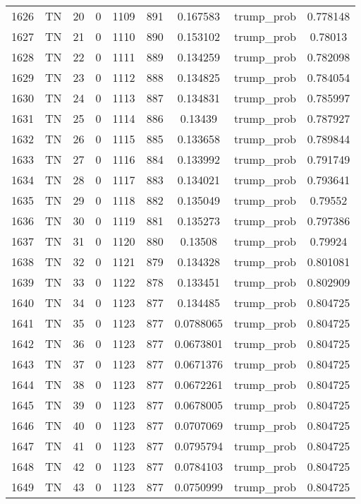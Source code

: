 \documentclass[12pt,a4paper]{article}
\begin{document}
\begin{tabular}{r|cccccccc}
	1626 & TN & 20 & 0 & 1109 & 891 & 0.167583 & trump\_prob & 0.778148 \\
	1627 & TN & 21 & 0 & 1110 & 890 & 0.153102 & trump\_prob & 0.78013 \\
	1628 & TN & 22 & 0 & 1111 & 889 & 0.134259 & trump\_prob & 0.782098 \\
	1629 & TN & 23 & 0 & 1112 & 888 & 0.134825 & trump\_prob & 0.784054 \\
	1630 & TN & 24 & 0 & 1113 & 887 & 0.134831 & trump\_prob & 0.785997 \\
	1631 & TN & 25 & 0 & 1114 & 886 & 0.13439 & trump\_prob & 0.787927 \\
	1632 & TN & 26 & 0 & 1115 & 885 & 0.133658 & trump\_prob & 0.789844 \\
	1633 & TN & 27 & 0 & 1116 & 884 & 0.133992 & trump\_prob & 0.791749 \\
	1634 & TN & 28 & 0 & 1117 & 883 & 0.134021 & trump\_prob & 0.793641 \\
	1635 & TN & 29 & 0 & 1118 & 882 & 0.135049 & trump\_prob & 0.79552 \\
	1636 & TN & 30 & 0 & 1119 & 881 & 0.135273 & trump\_prob & 0.797386 \\
	1637 & TN & 31 & 0 & 1120 & 880 & 0.13508 & trump\_prob & 0.79924 \\
	1638 & TN & 32 & 0 & 1121 & 879 & 0.134328 & trump\_prob & 0.801081 \\
	1639 & TN & 33 & 0 & 1122 & 878 & 0.133451 & trump\_prob & 0.802909 \\
	1640 & TN & 34 & 0 & 1123 & 877 & 0.134485 & trump\_prob & 0.804725 \\
	1641 & TN & 35 & 0 & 1123 & 877 & 0.0788065 & trump\_prob & 0.804725 \\
	1642 & TN & 36 & 0 & 1123 & 877 & 0.0673801 & trump\_prob & 0.804725 \\
	1643 & TN & 37 & 0 & 1123 & 877 & 0.0671376 & trump\_prob & 0.804725 \\
	1644 & TN & 38 & 0 & 1123 & 877 & 0.0672261 & trump\_prob & 0.804725 \\
	1645 & TN & 39 & 0 & 1123 & 877 & 0.0678005 & trump\_prob & 0.804725 \\
	1646 & TN & 40 & 0 & 1123 & 877 & 0.0707069 & trump\_prob & 0.804725 \\
	1647 & TN & 41 & 0 & 1123 & 877 & 0.0795794 & trump\_prob & 0.804725 \\
	1648 & TN & 42 & 0 & 1123 & 877 & 0.0784103 & trump\_prob & 0.804725 \\
	1649 & TN & 43 & 0 & 1123 & 877 & 0.0750999 & trump\_prob & 0.804725 \\

\end{tabular}
\end{document}
